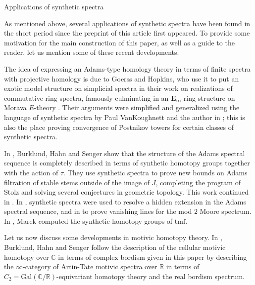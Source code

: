 \documentclass[oneside,a4paper]{amsart}
\makeatletter
\theoremstyle{plain}
\theoremstyle{definition}
\theoremstyle{remark}
\def\subsection{\@startsection{subsection}{1}%
  \z@{.7\linespacing\@plus\linespacing}{.5\linespacing}%
  {\normalfont\bfseries\centering}}%
\makeatother
\begin{document}
\subsection{Applications of synthetic spectra}
\label{subsection:applications_of_synthetic_spectra}

As mentioned above, several applications of synthetic spectra have been found in the short period since the preprint of this article first appeared. To provide some motivation for the main construction of this paper, as well as a guide to the reader, let us mention some of these recent developments. 

The idea of expressing an Adams-type homology theory in terms of finite spectra with projective homology is due to Goerss and Hopkins, who use it to put an exotic model structure on simplicial spectra in their work on realizations of commutative ring spectra, famously culminating in an $\mathbf{E}_{\infty}$-ring structure on Morava $E$-theory \cite{moduli_problems_for_structured_ring_spectra, moduli_spaces_of_commutative_ring_spectra}. Their arguments were simplified and generalized using the language of synthetic spectra by Paul VanKoughnett and the author in \cite{pstrkagowski2021abstract}; this is also the place proving convergence of Postnikov towers for certain classes of synthetic spectra. 

In \cite{burklund2019boundaries}, Burklund, Hahn and Senger show that the structure of the Adams spectral sequence is completely described in terms of synthetic homotopy groups together with the action of $\tau$. They use synthetic spectra to prove new bounds on Adams filtration of stable stems outside of the image of $J$, completing the program of Stolz and solving several conjectures in geometric topology. This work continued in \cite{burklund2020high, burklund2020inertia}. In \cite{burklund2021extension}, synthetic spectra were used to resolve a hidden extension in the Adams spectral sequence, and in \cite{chang_banded_vanishing_line} to prove vanishing lines for the mod $2$ Moore spectrum. In \cite{marek2022h}, Marek computed the synthetic homotopy groups of $\mathrm{tmf}$. 

Let us now discuss some developments in motivic homotopy theory. In \cite{burklund2020galois}, Burklund, Hahn and Senger follow the description of the cellular motivic homotopy over $\mathbb{C}$ in terms of complex bordism given in this paper by describing the $\infty$-category of Artin-Tate motivic spectra over $\mathbb{R}$ in terms of $C_{2} = \mathrm{Gal}(\mathbb{C}/\mathbb{R})$-equivariant homotopy theory and the real bordism spectrum. 
\end{document}
